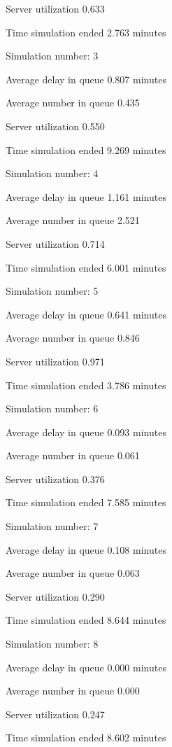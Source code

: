 \documentclass{article}
\begin{document}
Server utilization          0.633

Time simulation ended       2.763 minutes

Simulation number: 3



Average delay in queue      0.807 minutes

Average number in queue     0.435

Server utilization          0.550

Time simulation ended       9.269 minutes

Simulation number: 4



Average delay in queue      1.161 minutes

Average number in queue     2.521

Server utilization          0.714

Time simulation ended       6.001 minutes

Simulation number: 5



Average delay in queue      0.641 minutes

Average number in queue     0.846

Server utilization          0.971

Time simulation ended       3.786 minutes

Simulation number: 6



Average delay in queue      0.093 minutes

Average number in queue     0.061

Server utilization          0.376

Time simulation ended       7.585 minutes

Simulation number: 7



Average delay in queue      0.108 minutes

Average number in queue     0.063

Server utilization          0.290

Time simulation ended       8.644 minutes

Simulation number: 8



Average delay in queue      0.000 minutes

Average number in queue     0.000

Server utilization          0.247

Time simulation ended       8.602 minutes
\end{document}
